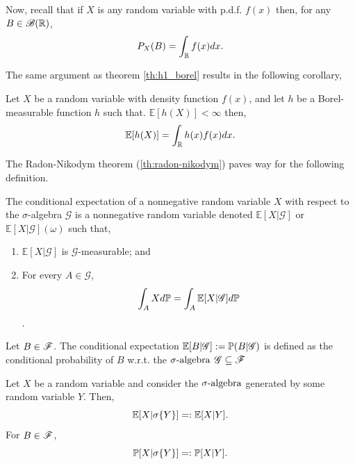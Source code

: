 \documentclass[../TGMAFFIRO.tex]{subfiles}
\begin{document}
Now, recall that if $X$ is any random variable with p.d.f. $f(x)$ then, for any $B \in \mathscr{B}(\mathbb{R})$,
\begin{equation*}
	P_X(B) = \int_{\mathbb{R}}  f(x) dx.
\end{equation*}

The same argument as theorem \ref{th:h1_borel} results in the following corollary,
\begin{corollary}
	Let $X$ be a random variable with density function $f(x)$, and let $h$ be a Borel-measurable function $h$ such that. $\mathbb{E}[h(X)] < \infty$ then,
	\begin{equation}
		\mathbb{E}[h(X)] = \int_{\mathbb{R}} h(x) f(x) dx.
	\end{equation}
\end{corollary}

The Radon-Nikodym theorem (\ref{th:radon-nikodym}) paves way for the following definition.

\begin{definition}
The conditional expectation of a nonnegative random variable $X$ with respect to the $\sigma$-algebra $\mathscr{G}$ is a nonnegative random variable denoted $\mathbb{E}[X | \mathscr{G}]$ or $\mathbb{E}[X | \mathscr{G}](\omega)$ such that,
\begin{enumerate}
	\item $\mathbb{E}[X | \mathscr{G}]$ is $\mathscr{G}$-measurable; and
	\item For every $A \in \mathscr{G}$,
	\[\int_A X d\mathbb{P} = \int_A \mathbb{E}[X | \mathscr{G}] d\mathbb{P}\].
\end{enumerate}
\end{definition}

\begin{definition}
	Let $B\in\mathscr{F}$. The conditional expectation $\mathbb{E}[B | \mathscr{G}] := \mathbb{P}(B | \mathscr{G})$ is defined as the conditional probability of $B$ w.r.t. the $\sigma\text{-algebra}$ $\mathscr{G} \subseteq \mathscr{F}$
\end{definition}


\begin{definition}
	Let $X$ be a random variable and consider the $\sigma\text{-algebra}$ generated by some random variable $Y$. Then,
	\begin{equation}
		\mathbb{E}[X | \sigma\{Y\}] =: \mathbb{E}[X | Y].
	\end{equation}
	For $B \in \mathscr{F}$,
	\begin{equation}
		\mathbb{P}[X | \sigma\{Y\}] =: \mathbb{P}[X | Y].
	\end{equation}
\end{definition}
\end{document}
